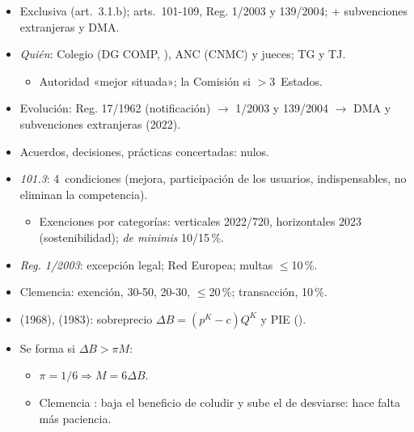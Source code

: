 \documentclass{article}
\begin{document}
\begin{columnas}
\begin{itemize}
\item Exclusiva (art.~3.1.b); arts.~101-109, Reg. 1/2003 y 139/2004; + subvenciones extranjeras y DMA.
\item \emph{Quién}: Colegio (DG COMP, ), ANC (CNMC) y jueces; TG y TJ.
  \begin{itemize}
  \item Autoridad «mejor situada»; la Comisión si $>$3~Estados.
  \end{itemize}
\item Evolución: Reg. 17/1962 (notificación) $\to$ 1/2003 y 139/2004 $\to$ DMA y subvenciones extranjeras (2022).
\end{itemize}
\begin{itemize}
\item Acuerdos, decisiones, prácticas concertadas: nulos.
\item \emph{101.3}: 4~condiciones (mejora, participación de los usuarios, indispensables, no eliminan la competencia).
  \begin{itemize}
  \item Exenciones por categorías: verticales 2022/720, horizontales 2023 (sostenibilidad); \emph{de minimis} 10/15\,\%.
  \end{itemize}
\item \emph{Reg. 1/2003}: excepción legal; Red Europea; multas $\leq$10\,\%.
\item Clemencia: exención, 30-50, 20-30, $\leq$20\,\%; transacción, 10\,\%.
\end{itemize}
\begin{itemize}
\item {} (1968),  (1983): sobreprecio $\Delta B=(p^K-c)Q^K$ y PIE ().
\item Se forma si $\Delta B>\pi M$:
  \begin{itemize}
  \item $\pi=1/6\Rightarrow M=6\Delta B$.
  \item Clemencia : baja el beneficio de coludir y sube el de desviarse: hace falta más paciencia.
  \end{itemize}

\end{itemize}
\end{columnas}
\end{document}
